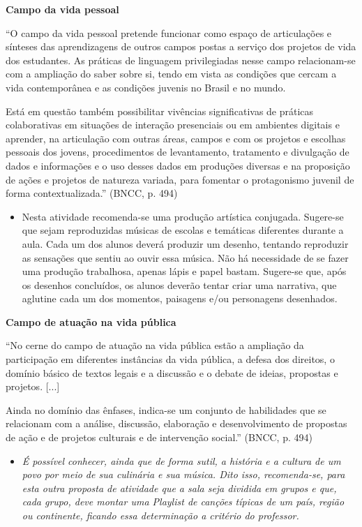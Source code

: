 \documentclass[12pt]{extarticle}
\begin{document}
\textbf{Campo da vida pessoal}

``O campo da vida pessoal pretende funcionar como espaço de articulações
e sínteses das aprendizagens de outros campos postas a serviço dos
projetos de vida dos estudantes. As práticas de linguagem privilegiadas
nesse campo relacionam-se com a ampliação do saber sobre si, tendo em
vista as condições que cercam a vida contemporânea e as condições
juvenis no Brasil e no mundo.

Está em questão também possibilitar vivências significativas de práticas
colaborativas em situações de interação presenciais ou em ambientes
digitais e aprender, na articulação com outras áreas, campos e com os
projetos e escolhas pessoais dos jovens, procedimentos de levantamento,
tratamento e divulgação de dados e informações e o uso desses dados em
produções diversas e na proposição de ações e projetos de natureza
variada, para fomentar o protagonismo juvenil de forma
contextualizada.'' (BNCC, p. 494)

\begin{itemize}
\item
  Nesta atividade recomenda-se uma produção artística conjugada.
  Sugere-se que sejam reproduzidas músicas de escolas e temáticas
  diferentes durante a aula. Cada um dos alunos deverá produzir um
  desenho, tentando reproduzir as sensações que sentiu ao ouvir essa
  música. Não há necessidade de se fazer uma produção trabalhosa, apenas
  lápis e papel bastam. Sugere-se que, após os desenhos concluídos, os
  alunos deverão tentar criar uma narrativa, que aglutine cada um dos
  momentos, paisagens e/ou personagens desenhados.
\end{itemize}

\textbf{Campo de atuação na vida pública}

``No cerne do campo de atuação na vida pública estão a ampliação da
participação em diferentes instâncias da vida pública, a defesa dos
direitos, o domínio básico de textos legais e a discussão e o debate de
ideias, propostas e projetos. {[}...{]}

Ainda no domínio das ênfases, indica-se um conjunto de habilidades que
se relacionam com a análise, discussão, elaboração e desenvolvimento de
propostas de ação e de projetos culturais e de intervenção social.''
(BNCC, p. 494)

\begin{itemize}
\item
  \textit{É possível conhecer, ainda que de forma sutil, a história e a
  cultura de um povo por meio de sua culinária e sua música. Dito isso,
  recomenda-se, para esta outra proposta de atividade que a sala seja
  dividida em grupos e que, cada grupo, deve montar uma Playlist de
  canções típicas de um país, região ou continente, ficando essa
  determinação a critério do professor.}
\end{itemize}
\end{document}
